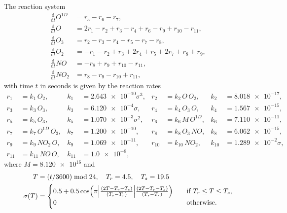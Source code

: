 \documentclass[a4paper]{article}
\numberwithin{equation}{section}
\theoremstyle{plain}
\theoremstyle{definition}
\numberwithin{theorem}{section}
\newcommand{\1}{\mathbbm{1}}
\begin{document}
The reaction system
\begin{equation}
\label{eq:stratospheric}
\begin{aligned}
  \frac{\mathrm d}{\mathrm d t} O^{1D} &= r_5 - r_6 - r_7, \\
  \frac{\mathrm d}{\mathrm d t} O      &= 2 r_1 - r_2 + r_3 - r_4 + r_6 - r_9 + r_{10} - r_{11}, \\
  \frac{\mathrm d}{\mathrm d t} O_3    &= r_2 - r_3 - r_4 - r_5 - r_7 - r_8, \\
  \frac{\mathrm d}{\mathrm d t} O_2    &= -r_1 - r_2 + r_3 + 2 r_4 + r_5 + 2r_7 + r_8 + r_9, \\
  \frac{\mathrm d}{\mathrm d t} NO     &= -r_8 + r_9 + r_{10} - r_{11}, \\
  \frac{\mathrm d}{\mathrm d t} NO_2   &= r_8 - r_9 - r_{10} + r_{11},
\end{aligned}
\end{equation}
with time $t$ in seconds is given by the reaction rates
\begin{equation}
\begin{aligned}
  r_{1}  &= k_1\, O_2,          &  k_{1}  &= \num{2.643e-10} \sigma^3, &
  r_{2}  &= k_2\, O\, O_2,      &  k_{2}  &= \num{8.018e-17}, \\
  r_{3}  &= k_3\, O_3,          &  k_{3}  &= \num{6.120e-4} \sigma, &
  r_{4}  &= k_4\, O_3\, O,      &  k_{4}  &= \num{1.567e-15}, \\
  r_{5}  &= k_5\, O_3,          &  k_{5}  &= \num{1.070e-3} \sigma^2, &
  r_{6}  &= k_6\, M\, O^{1D},   &  k_{6}  &= \num{7.110e-11}, \\
  r_{7}  &= k_7\, O^{1D}\, O_3, &  k_{7}  &= \num{1.200e-10}, &
  r_{8}  &= k_8\, O_3\, NO,     &  k_{8}  &= \num{6.062e-15}, \\
  r_{9}  &= k_9\, NO_2\, O,     &  k_{9}  &= \num{1.069e-11}, &
  r_{10} &= k_{10}\, NO_2,      &  k_{10} &= \num{1.289e-2} \sigma, \\
  r_{11} &= k_{11}\, NO\, O,    &  k_{11} &= \num{1.0e-8},
\end{aligned}
\end{equation}
where $M  = \num{8.120e16}$ and
\begin{align}
    T &= (t/3600) \bmod 24,
    \quad T_r = 4.5,
    \quad T_s = 19.5 \\
    \sigma(T) &=
    \begin{cases}
    0.5+0.5 \cos\Bigl(\pi \Bigl|\frac{(2T-T_r-T_s)}{(T_s-T_r)}\Bigr| \frac{(2T-T_r-T_s)}{(T_s-T_r)} \Bigr)       & \quad \text{if } T_r \leq T \leq T_s,\\
    0  & \quad \text{otherwise}.
    \end{cases}
\end{align}
\end{document}
